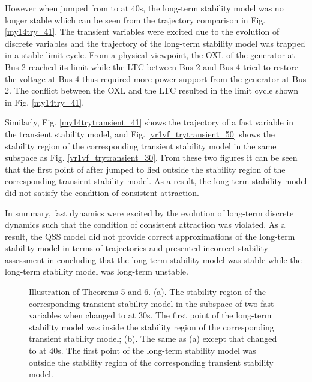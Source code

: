\documentclass[journal]{IEEEtran}
\begin{document}
However when  jumped from  to  at 40s, the long-term stability model was no longer stable which can be seen from the trajectory comparison in Fig. \ref{my14try_41}. The transient variables were excited due to the evolution of discrete variables  and the trajectory of the long-term stability model was trapped in a stable limit cycle. From a physical viewpoint, the OXL of the generator at Bus 2 reached its limit while the LTC between Bus 2 and Bus 4 tried to restore the voltage at Bus 4 thus required more power support from the generator at Bus 2. The conflict between the OXL and the LTC resulted in the limit cycle shown in Fig. \ref{my14try_41}.

Similarly, Fig. \ref{my14trytransient_41} shows the trajectory of a fast variable in the transient stability model, and Fig. \ref{vr1vf_trytransient_50} shows the stability region of the corresponding transient stability model in the same subspace as Fig. \ref{vr1vf_trytransient_30}. From these two figures it can be seen that the first point  of  after  jumped to  lied outside the stability region  of the corresponding transient stability model. As a result, the long-term stability model did not satisfy the condition of consistent attraction.

In summary, fast dynamics were excited by the evolution of long-term discrete dynamics  such that the condition of consistent attraction was violated. As a result, the QSS model did not provide correct approximations of the long-term stability model in terms of trajectories and presented incorrect stability assessment in concluding that the long-term stability model was stable while the long-term stability model was long-term unstable.

\begin{figure}\centering
{}
\caption{Illustration of Theorems 5 and 6. (a). The stability region of the corresponding transient stability model in the subspace of two fast variables when  changed to  at 30s. The first point of the long-term stability model was inside the stability region of the corresponding transient stability model; (b). The same as (a) except that  changed to  at 40s. The first point of the long-term stability model was outside the stability region of the corresponding transient stability model.}
\label{my14try_SR}
\end{figure}
\end{document}
